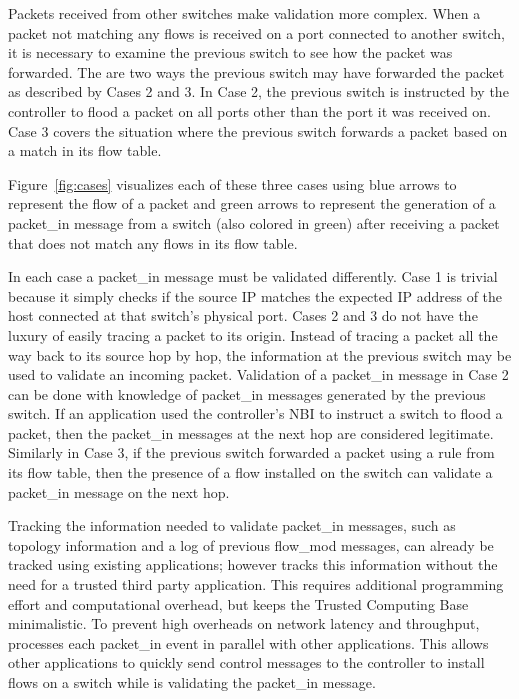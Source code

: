 Packets received from other switches make validation more complex. When
a packet not matching any flows is received on a port connected to 
another switch, it is necessary to examine the previous switch to see 
how the packet was forwarded. The are two ways the previous switch may 
have forwarded the packet as described by Cases 2 and 3. In Case 2, the 
previous switch is instructed by the controller to flood a packet on 
all ports other than the port it was received on. Case 3 covers the
situation where the previous switch forwards a packet based on a match
in its flow table. 

Figure~\ref{fig:cases} visualizes each of these three cases using blue 
arrows to represent the flow of a packet and green arrows to represent 
the generation of a packet\_in message from a switch (also colored in
green) after receiving a packet that does not match any flows in its 
flow table.

In each case a packet\_in message must be validated differently. Case 1
is trivial because it simply checks if the source IP matches the
expected IP address of the host connected at that switch's physical 
port. Cases 2 and 3 do not have the luxury of easily tracing a packet to
its origin. Instead of tracing a packet all the way back to its source
hop by hop, the information at the previous switch may be used to 
validate an incoming packet. Validation of a packet\_in message in Case 
2 can be done with knowledge of packet\_in messages generated by the 
previous switch. If an application used the controller's NBI to instruct
a switch to flood a packet, then the packet\_in messages at the next hop
are considered legitimate. Similarly in Case 3, if the previous switch 
forwarded a packet using a rule from its flow table, then the presence 
of a flow installed on the switch can validate a packet\_in message on 
the next hop.

Tracking the information needed to validate packet\_in messages, such as
topology information and a log of previous flow\_mod messages, can
already be tracked using existing applications; however \name tracks
this information without the need for a trusted third party application.
This requires additional programming effort and computational overhead, 
but keeps the Trusted Computing Base minimalistic. To prevent high 
overheads on network latency and throughput, \name processes each 
packet\_in event in parallel with other applications. This allows other
applications to quickly send control messages to the controller to
install flows on a switch while \name is validating the packet\_in
message. 

